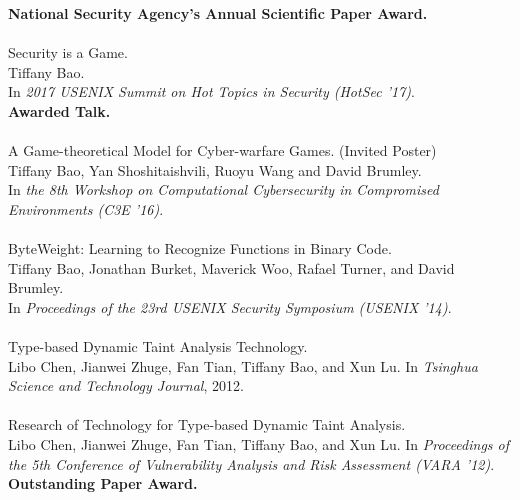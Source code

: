 \documentclass[11pt]{article}
\begin{document}
\textbf{National Security Agency's Annual Scientific Paper Award.}
\\\\
%
Security is a Game. \\
Tiffany Bao. \\
In \emph{2017 USENIX Summit on Hot Topics in Security (HotSec '17)}. \\
\textbf{Awarded Talk.}
\\\\
%
A Game-theoretical Model for Cyber-warfare Games. (Invited
Poster)\\
Tiffany Bao, Yan Shoshitaishvili, Ruoyu Wang and David
Brumley. \\
In \emph{the 8th Workshop on Computational Cybersecurity in
Compromised Environments (C3E '16)}.
\\\\
%
ByteWeight: Learning to Recognize Functions in Binary Code.
\\
Tiffany Bao, Jonathan Burket, Maverick Woo, Rafael Turner,
and David Brumley.  \\
In \emph{Proceedings of the 23rd USENIX Security Symposium
(USENIX '14)}.
\\\\
%
Type-based Dynamic Taint Analysis Technology. \\
Libo Chen, Jianwei Zhuge, Fan Tian, Tiffany Bao, and Xun Lu.
In \emph{Tsinghua Science and Technology Journal}, 2012.
\\\\
%
Research of Technology for Type-based Dynamic Taint Analysis. \\
Libo Chen, Jianwei Zhuge, Fan Tian, Tiffany Bao, and Xun Lu.
In \emph{Proceedings of the 5th Conference of Vulnerability Analysis
and Risk Assessment (VARA '12)}. \\
\textbf{Outstanding Paper Award.}


\end{document}
